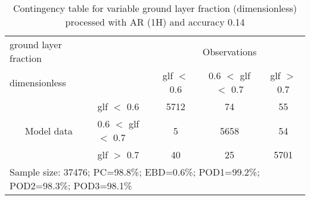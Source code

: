 \begin{table}[]
\begin{center}
\begin{tabular}{llccc}
\hline
{ground layer fraction}                                       &                                                    & \multicolumn{3}{c}{Observations}                 \\
{dimensionless}                                       &                             & glf $<$ 0.6   & 0.6 $<$ glf $<$ 0.7 & glf $>$ 0.7 \\
\hline
\multicolumn{1}{c}{\multirow{3}{*}{Model data}}  & glf $<$ 0.6             & 5712                & 74                       & 55              \\
                                                 & 0.6  $<$ glf $<$ 0.7 & 5                & 5658                       & 54              \\
                                                 & glf $>$ 0.7             & 40                & 25                       & 5701              \\
\hline
\multicolumn{5}{l}{Sample size: 37476; PC=98.8\%; EBD=0.6\%; POD1=99.2\%; POD2=98.3\%; POD3=98.1\%}
\end{tabular}
\end{center}
\caption{Contingency table for variable ground layer fraction (dimensionless) processed with AR (1H) and accuracy 0.14}
\label{tab:contingencyglfAFT}
\end{table}
